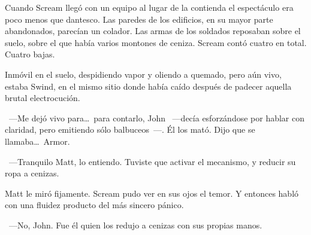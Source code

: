 \bigskip\noindent
Cuando Scream llegó con un equipo al lugar de la contienda el espectáculo era poco menos que dantesco. Las paredes de los edificios, en su mayor parte abandonados, parecían un colador. Las armas de los soldados reposaban sobre el suelo, sobre el que había varios montones de ceniza. Scream contó cuatro en total. Cuatro bajas.

Inmóvil en el suelo, despidiendo vapor y oliendo a quemado, pero aún vivo, estaba Swind, en el mismo sitio donde había caído después de padecer aquella brutal electrocución.

~---Me dejó vivo para\dots\ para contarlo, John ~---decía esforzándose por hablar con claridad, pero emitiendo sólo balbuceos~---. Él los mató. Dijo que se llamaba\dots\ Armor.

~---Tranquilo Matt, lo entiendo. Tuviste que activar el mecanismo, y reducir su ropa a cenizas.

Matt le miró fijamente. Scream pudo ver en sus ojos el temor. Y entonces habló con una fluidez producto del más sincero pánico.

~---No, John. Fue él quien los redujo a cenizas con sus propias manos.

\endinput
